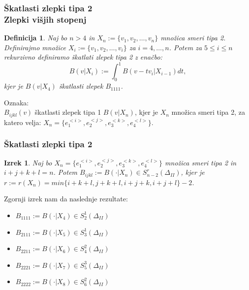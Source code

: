 \documentclass{beamer}
\newtheorem{izrek}{Izrek}
\newtheorem{definicija}{Definicija}
\begin{document}

\begin{frame}
\frametitle{Škatlasti zlepki tipa 2 \\ Zlepki višjih stopenj}

\begin{definicija}
Naj bo $n > 4$ in $X_n := \{v_1, v_2, \ldots , v_n\}$ množica smeri tipa 2.
Definirajmo množice $X_i := \{v_1, v_2, \ldots , v_i\}$ za $i = 4, \ldots, n$.
Potem za $5 \leq i \leq n$ rekurzivno definiramo škatlati zlepek tipa 2  z enačbo:
$$B(v|X_i) := \int_0^1 B(v-tv_i | X_{i-1}) dt,$$
kjer je $B(v|X_4)$ škatlasti zlepek $B_{1111}$.
\end{definicija}

\vspace{5mm}

Oznaka: \\
\textbf{$B_{ijkl}(v)$} škatlasti zlepek tipa 1 $B(v|X_n)$, kjer je $X_n$ množica smeri tipa 2, za katero velja: $X_n = \{e_1^{<i>},e_2^{<j>}, e_3^{<k>}, e_4^{<l>}\}$.

\end{frame}



\begin{frame}
\frametitle{Škatlasti zlepki tipa 2}

\begin{izrek}
Naj bo $X_n = \{e_1^{<i>},e_2^{<j>}, e_3^{<k>}, e_4^{<l>}\}$ množica smeri tipa 2 in $i+j+k+l = n$.
Potem $B_{ijkl} := B(\cdot | X_n) \in S_{n-2}^r (\Delta_{II})$, kjer je $r := r(X_n) = min\{i+k+l, j+k+l, i+j+k, i+j+l\} -2$.
\end{izrek}

\vspace{3mm}
\pause

Zgornji izrek nam da naslednje rezultate:
\begin{itemize}
\item $B_{1111} := B(\cdot | X_4) \in S_{2}^1 (\Delta_{II})$
\item $B_{2111} := B(\cdot | X_5) \in S_{3}^1 (\Delta_{II})$
\item $B_{2211} := B(\cdot | X_6) \in S_{4}^2 (\Delta_{II})$
\item $B_{2221} := B(\cdot | X_7) \in S_{5}^3 (\Delta_{II})$
\item $B_{2222} := B(\cdot | X_8) \in S_{6}^2 (\Delta_{II})$
\end{itemize}

\end{frame}
\end{document}
